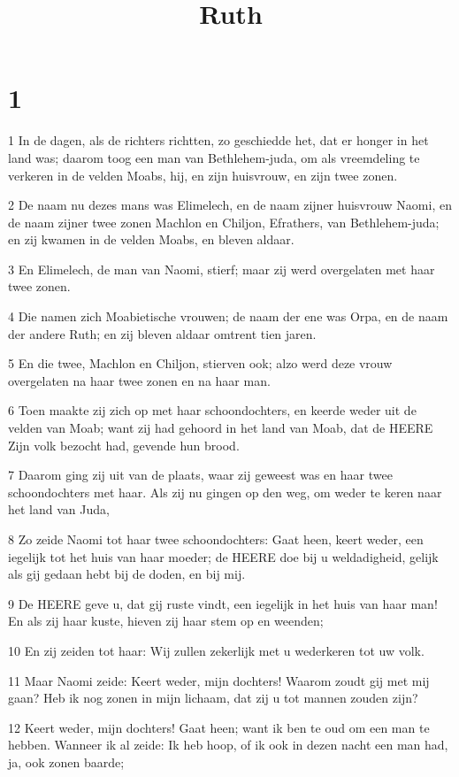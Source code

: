 

\title{Ruth}



\chapter{1}

\par 1 In de dagen, als de richters richtten, zo geschiedde het, dat er honger in het land was; daarom toog een man van Bethlehem-juda, om als vreemdeling te verkeren in de velden Moabs, hij, en zijn huisvrouw, en zijn twee zonen.
\par 2 De naam nu dezes mans was Elimelech, en de naam zijner huisvrouw Naomi, en de naam zijner twee zonen Machlon en Chiljon, Efrathers, van Bethlehem-juda; en zij kwamen in de velden Moabs, en bleven aldaar.
\par 3 En Elimelech, de man van Naomi, stierf; maar zij werd overgelaten met haar twee zonen.
\par 4 Die namen zich Moabietische vrouwen; de naam der ene was Orpa, en de naam der andere Ruth; en zij bleven aldaar omtrent tien jaren.
\par 5 En die twee, Machlon en Chiljon, stierven ook; alzo werd deze vrouw overgelaten na haar twee zonen en na haar man.
\par 6 Toen maakte zij zich op met haar schoondochters, en keerde weder uit de velden van Moab; want zij had gehoord in het land van Moab, dat de HEERE Zijn volk bezocht had, gevende hun brood.
\par 7 Daarom ging zij uit van de plaats, waar zij geweest was en haar twee schoondochters met haar. Als zij nu gingen op den weg, om weder te keren naar het land van Juda,
\par 8 Zo zeide Naomi tot haar twee schoondochters: Gaat heen, keert weder, een iegelijk tot het huis van haar moeder; de HEERE doe bij u weldadigheid, gelijk als gij gedaan hebt bij de doden, en bij mij.
\par 9 De HEERE geve u, dat gij ruste vindt, een iegelijk in het huis van haar man! En als zij haar kuste, hieven zij haar stem op en weenden;
\par 10 En zij zeiden tot haar: Wij zullen zekerlijk met u wederkeren tot uw volk.
\par 11 Maar Naomi zeide: Keert weder, mijn dochters! Waarom zoudt gij met mij gaan? Heb ik nog zonen in mijn lichaam, dat zij u tot mannen zouden zijn?
\par 12 Keert weder, mijn dochters! Gaat heen; want ik ben te oud om een man te hebben. Wanneer ik al zeide: Ik heb hoop, of ik ook in dezen nacht een man had, ja, ook zonen baarde;
